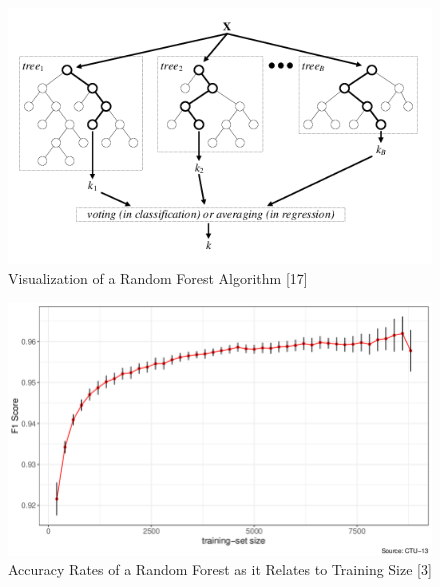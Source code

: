 \documentclass[12pt,journal,compsoc]{IEEEtran}
\newenvironment{subs}
  {\adjustwidth{1em}{0pt}}
  {\endadjustwidth}
\begin{document}
\begin{subs}
\begin{subs}
\begin{subs}
\begin{figure}[H]
\centering
\includegraphics[width=5in]{images/random_forest.png}
\caption{Visualization of a Random Forest Algorithm [17]}
\label{fig:rf_visual}
\end{figure}

\begin{figure}[H]
\centering
\includegraphics[width=5in]{images/random_forest_acc.png}
\caption{Accuracy Rates of a Random Forest as it Relates to Training Size [3]}
\label{fig:accuracy_rf}
\end{figure}


\end{subs}
\end{subs}
\end{subs}
\end{document}
